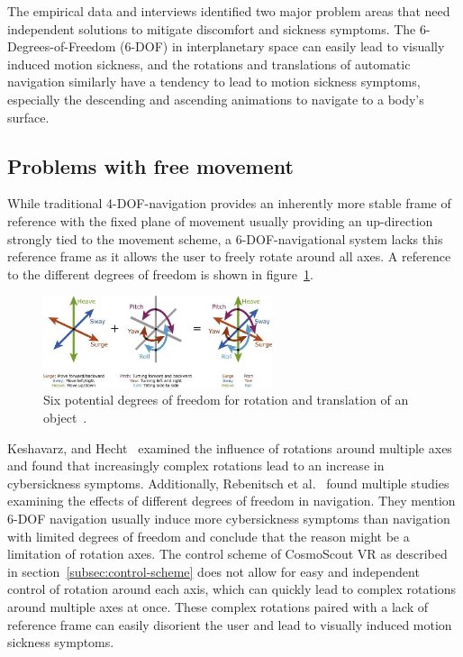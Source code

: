 The empirical data and interviews identified two major problem areas that need independent solutions to mitigate
discomfort and sickness symptoms.
The 6-Degrees-of-Freedom (6-DOF) in interplanetary space can easily lead to visually induced motion sickness, and the
rotations and translations of automatic navigation similarly have a tendency to lead to motion sickness symptoms,
especially the descending and ascending animations to navigate to a body's surface.


\subsection{Problems with free movement}\label{subsec:problems-with-free-movement}

While traditional 4-DOF-navigation provides an inherently more stable frame of reference with the fixed plane of
movement usually providing an up-direction strongly tied to the movement scheme, a 6-DOF-navigational system lacks this
reference frame as it allows the user to freely rotate around all axes.
A reference to the different degrees of freedom is shown in figure~\ref{fig:6-dof-reference}.

\begin{figure}[h]
    \centering
    \includegraphics[width=0.6\textwidth]{content/3_current_state/img/6-DOF-reference[Fragaszy2018]}
    \caption{Six potential degrees of freedom for rotation and translation of an object~\cite{Fragaszy2018}.}
    \label{fig:6-dof-reference}
\end{figure}

Keshavarz, and Hecht~\cite{Keshavarz2011b} examined the influence of rotations around multiple axes and found that
increasingly complex rotations lead to an increase in cybersickness symptoms.
Additionally, Rebenitsch et al.~\cite{Rebenitsch2016} found multiple studies examining the effects of different
degrees of freedom in navigation.
They mention 6-DOF navigation usually induce more cybersickness symptoms than navigation with limited degrees of
freedom and conclude that the reason might be a limitation of rotation axes.
The control scheme of CosmoScout VR as described in section~\ref{subsec:control-scheme} does not allow for easy and
independent control of rotation around each axis, which can quickly lead to complex rotations around multiple axes at
once.
These complex rotations paired with a lack of reference frame can easily disorient the user and lead to visually
induced motion sickness symptoms.

